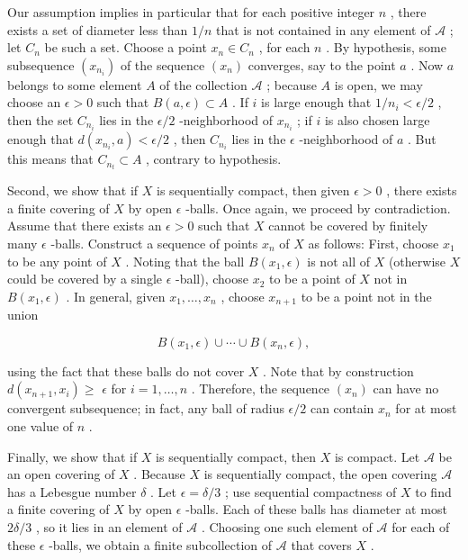 Our assumption implies in particular that for each positive integer \(n\) , there exists a set of diameter less than \(1/n\) that is not contained in any element of \(\mathcal{A}\) ; let \({C}_{n}\) be such a set. Choose a point \({x}_{n} \in  {C}_{n}\) , for each \(n\) . By hypothesis, some subsequence \(\left( {x}_{{n}_{i}}\right)\) of the sequence \(\left( {x}_{n}\right)\) converges, say to the point \(a\) . Now \(a\) belongs to some element \(A\) of the collection \(\mathcal{A}\) ; because \(A\) is open, we may choose an \(\epsilon  > 0\) such that \(B\left( {a,\epsilon }\right)  \subset  A\) . If \(i\) is large enough that \(1/{n}_{i} < \epsilon /2\) , then the set \({C}_{{n}_{i}}\) lies in the \(\epsilon /2\) -neighborhood of \({x}_{{n}_{i}}\) ; if \(i\) is also chosen large enough that \(d\left( {{x}_{{n}_{i}},a}\right)  < \epsilon /2\) , then \({C}_{{n}_{i}}\) lies in the \(\epsilon\) -neighborhood of \(a\) . But this means that \({C}_{{n}_{t}} \subset  A\) , contrary to hypothesis.

Second, we show that if \(X\) is sequentially compact, then given \(\epsilon  > 0\) , there exists a finite covering of \(X\) by open \(\epsilon\) -balls. Once again, we proceed by contradiction. Assume that there exists an \(\epsilon  > 0\) such that \(X\) cannot be covered by finitely many \(\epsilon\) -balls. Construct a sequence of points \({x}_{n}\) of \(X\) as follows: First, choose \({x}_{1}\) to be any point of \(X\) . Noting that the ball \(B\left( {{x}_{1},\epsilon }\right)\) is not all of \(X\) (otherwise \(X\) could be covered by a single \(\epsilon\) -ball), choose \({x}_{2}\) to be a point of \(X\) not in \(B\left( {{x}_{1},\epsilon }\right)\) . In general, given \({x}_{1},\ldots ,{x}_{n}\) , choose \({x}_{n + 1}\) to be a point not in the union

\[
B\left( {{x}_{1},\epsilon }\right)  \cup  \cdots  \cup  B\left( {{x}_{n},\epsilon }\right) ,
\]

using the fact that these balls do not cover \(X\) . Note that by construction \(d\left( {{x}_{n + 1},{x}_{i}}\right)  \geq\)  \(\epsilon\) for \(i = 1,\ldots ,n\) . Therefore, the sequence \(\left( {x}_{n}\right)\) can have no convergent subsequence; in fact, any ball of radius \(\epsilon /2\) can contain \({x}_{n}\) for at most one value of \(n\) .

Finally, we show that if \(X\) is sequentially compact, then \(X\) is compact. Let \(\mathcal{A}\) be an open covering of \(X\) . Because \(X\) is sequentially compact, the open covering \(\mathcal{A}\) has a Lebesgue number \(\delta\) . Let \(\epsilon  = \delta /3\) ; use sequential compactness of \(X\) to find a finite covering of \(X\) by open \(\epsilon\) -balls. Each of these balls has diameter at most \({2\delta }/3\) , so it lies in an element of \(\mathcal{A}\) . Choosing one such element of \(\mathcal{A}\) for each of these \(\epsilon\) -balls, we obtain a finite subcollection of \(\mathcal{A}\) that covers \(X\) .

